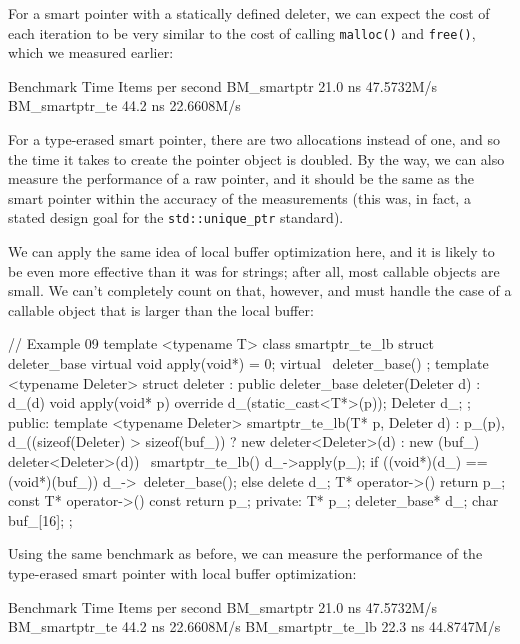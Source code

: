 For a smart pointer with a statically defined deleter, we can expect the cost of each iteration to be very similar to the cost of calling \texttt{malloc()} and \texttt{free()}, which we measured earlier:

\begin{code}
Benchmark                  Time Items per second
BM_smartptr             21.0 ns 47.5732M/s
BM_smartptr_te          44.2 ns 22.6608M/s
\end{code}

For a type-erased smart pointer, there are two allocations instead of one, and so the time it takes to create the pointer object is doubled. By the way, we can also measure the performance of a raw pointer, and it should be the same as the smart pointer within the accuracy of the measurements (this was, in fact, a stated design goal for the \texttt{std::unique\_ptr} standard).

We can apply the same idea of local buffer optimization here, and it is likely to be even more effective than it was for strings; after all, most callable objects are small. We can't completely count on that, however, and must handle the case of a callable object that is larger than the local buffer:

\begin{code}
// Example 09
template <typename T> class smartptr_te_lb {
  struct deleter_base {
    virtual void apply(void*) = 0;
    virtual ~deleter_base() {}
  };
  template <typename Deleter>
    struct deleter : public deleter_base {
    deleter(Deleter d) : d_(d) {}
    void apply(void* p) override {
      d_(static_cast<T*>(p));
    }
    Deleter d_;
  };
  public:
  template <typename Deleter>
    smartptr_te_lb(T* p, Deleter d) : p_(p),
      d_((sizeof(Deleter) > sizeof(buf_))
         ? new deleter<Deleter>(d)
         : new (buf_) deleter<Deleter>(d)) {}
  ~smartptr_te_lb() {
    d_->apply(p_);
    if ((void*)(d_) == (void*)(buf_)) {
      d_->~deleter_base();
    } else {
      delete d_;
    }
  }
  T* operator->() { return p_; }
  const T* operator->() const { return p_; }
  private:
  T* p_;
  deleter_base* d_;
  char buf_[16];
};
\end{code}

Using the same benchmark as before, we can measure the performance of the type-erased smart pointer with local buffer optimization:

\begin{code}
Benchmark                  Time Items per second
BM_smartptr             21.0 ns 47.5732M/s
BM_smartptr_te          44.2 ns 22.6608M/s
BM_smartptr_te_lb       22.3 ns 44.8747M/s
\end{code}

